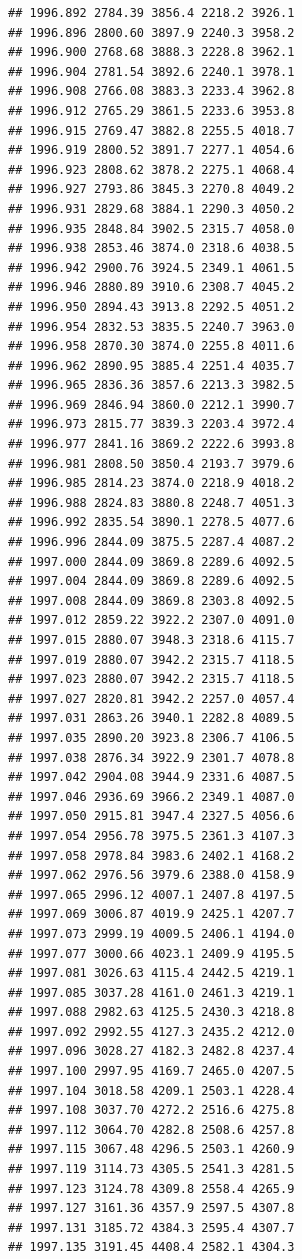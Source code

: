 \documentclass[
]{book}
\begin{document}
\begin{verbatim}
## 1996.892 2784.39 3856.4 2218.2 3926.1
## 1996.896 2800.60 3897.9 2240.3 3958.2
## 1996.900 2768.68 3888.3 2228.8 3962.1
## 1996.904 2781.54 3892.6 2240.1 3978.1
## 1996.908 2766.08 3883.3 2233.4 3962.8
## 1996.912 2765.29 3861.5 2233.6 3953.8
## 1996.915 2769.47 3882.8 2255.5 4018.7
## 1996.919 2800.52 3891.7 2277.1 4054.6
## 1996.923 2808.62 3878.2 2275.1 4068.4
## 1996.927 2793.86 3845.3 2270.8 4049.2
## 1996.931 2829.68 3884.1 2290.3 4050.2
## 1996.935 2848.84 3902.5 2315.7 4058.0
## 1996.938 2853.46 3874.0 2318.6 4038.5
## 1996.942 2900.76 3924.5 2349.1 4061.5
## 1996.946 2880.89 3910.6 2308.7 4045.2
## 1996.950 2894.43 3913.8 2292.5 4051.2
## 1996.954 2832.53 3835.5 2240.7 3963.0
## 1996.958 2870.30 3874.0 2255.8 4011.6
## 1996.962 2890.95 3885.4 2251.4 4035.7
## 1996.965 2836.36 3857.6 2213.3 3982.5
## 1996.969 2846.94 3860.0 2212.1 3990.7
## 1996.973 2815.77 3839.3 2203.4 3972.4
## 1996.977 2841.16 3869.2 2222.6 3993.8
## 1996.981 2808.50 3850.4 2193.7 3979.6
## 1996.985 2814.23 3874.0 2218.9 4018.2
## 1996.988 2824.83 3880.8 2248.7 4051.3
## 1996.992 2835.54 3890.1 2278.5 4077.6
## 1996.996 2844.09 3875.5 2287.4 4087.2
## 1997.000 2844.09 3869.8 2289.6 4092.5
## 1997.004 2844.09 3869.8 2289.6 4092.5
## 1997.008 2844.09 3869.8 2303.8 4092.5
## 1997.012 2859.22 3922.2 2307.0 4091.0
## 1997.015 2880.07 3948.3 2318.6 4115.7
## 1997.019 2880.07 3942.2 2315.7 4118.5
## 1997.023 2880.07 3942.2 2315.7 4118.5
## 1997.027 2820.81 3942.2 2257.0 4057.4
## 1997.031 2863.26 3940.1 2282.8 4089.5
## 1997.035 2890.20 3923.8 2306.7 4106.5
## 1997.038 2876.34 3922.9 2301.7 4078.8
## 1997.042 2904.08 3944.9 2331.6 4087.5
## 1997.046 2936.69 3966.2 2349.1 4087.0
## 1997.050 2915.81 3947.4 2327.5 4056.6
## 1997.054 2956.78 3975.5 2361.3 4107.3
## 1997.058 2978.84 3983.6 2402.1 4168.2
## 1997.062 2976.56 3979.6 2388.0 4158.9
## 1997.065 2996.12 4007.1 2407.8 4197.5
## 1997.069 3006.87 4019.9 2425.1 4207.7
## 1997.073 2999.19 4009.5 2406.1 4194.0
## 1997.077 3000.66 4023.1 2409.9 4195.5
## 1997.081 3026.63 4115.4 2442.5 4219.1
## 1997.085 3037.28 4161.0 2461.3 4219.1
## 1997.088 2982.63 4125.5 2430.3 4218.8
## 1997.092 2992.55 4127.3 2435.2 4212.0
## 1997.096 3028.27 4182.3 2482.8 4237.4
## 1997.100 2997.95 4169.7 2465.0 4207.5
## 1997.104 3018.58 4209.1 2503.1 4228.4
## 1997.108 3037.70 4272.2 2516.6 4275.8
## 1997.112 3064.70 4282.8 2508.6 4257.8
## 1997.115 3067.48 4296.5 2503.1 4260.9
## 1997.119 3114.73 4305.5 2541.3 4281.5
## 1997.123 3124.78 4309.8 2558.4 4265.9
## 1997.127 3161.36 4357.9 2597.5 4307.8
## 1997.131 3185.72 4384.3 2595.4 4307.7
## 1997.135 3191.45 4408.4 2582.1 4304.3

\end{verbatim}
\end{document}
